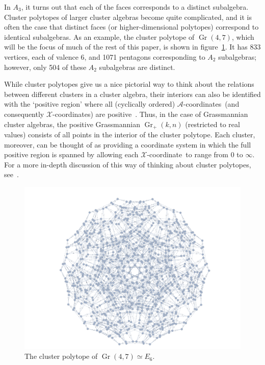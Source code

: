 \documentclass[12pt]{article}
\DeclareMathOperator{\Gr}{Gr}
\def\xcoord{$\mathcal{X}$-coordinate}
\def\xcoords{$\mathcal{X}$-coordinates}
\def\acoords{$\mathcal{A}$-coordinates}
\begin{document}
In $A_3$, it turns out that each of the faces corresponds to a distinct subalgebra. Cluster polytopes of larger cluster algebras become quite complicated, and it is often the case that distinct faces (or higher-dimensional polytopes) correspond to identical subalgebras. As an example, the cluster polytope of $\Gr(4,7)$, which will be the focus of much of the rest of this paper, is shown in figure~\ref{fig:e6-poly}. It has 833 vertices, each of valence 6, and 1071 pentagons corresponding to $A_2$ subalgebras; however, only 504 of these $A_2$ subalgebras are distinct.

While cluster polytopes give us a nice pictorial way to think about the relations between different clusters in a cluster algebra, their interiors can also be identified with the `positive region' where all (cyclically ordered) \acoords\ (and consequently \xcoords) are positive~\cite{ArkaniHamed:2012nw,Drummond:2018dfd}. Thus, in the case of Grassmannian cluster algebras, the positive Grassmannian $\Gr_+(k,n)$ (restricted to real values) consists of all points in the interior of the cluster polytope. Each cluster, moreover, can be thought of as providing a coordinate system in which the full positive region is spanned by allowing each \xcoord\ to range from $0$ to $\infty$. For a more in-depth discussion of this way of thinking about cluster polytopes, see~\cite{Drummond:2018dfd}.

\begin{figure}[t]  \centering
  \includegraphics[scale=0.25]{e6-associahedron}
  \caption{The cluster polytope of $\Gr(4,7) \simeq E_6$.}
  \label{fig:e6-poly}
\end{figure}
\end{document}
